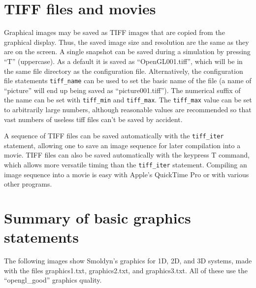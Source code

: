 \documentclass {scrbook}
\newcommand {\ttt} {\texttt}
\begin{document}
\section{TIFF files and movies}

Graphical images may be saved as TIFF images that are copied from the graphical display. Thus, the saved image size and resolution are the same as they are on the screen. A single snapshot can be saved during a simulation by pressing ``T'' (uppercase). As a default it is saved as ``OpenGL001.tiff'', which will be in the same file directory as the configuration file. Alternatively, the configuration file statements \ttt{tiff\_name} can be used to set the basic name of the file (a name of ``picture'' will end up being saved as ``picture001.tiff''). The numerical suffix of the name can be set with \ttt{tiff\_min} and \ttt{tiff\_max}. The \ttt{tiff\_max} value can be set to arbitrarily large numbers, although reasonable values are recommended so that vast numbers of useless tiff files can't be saved by accident.

A sequence of TIFF files can be saved automatically with the \ttt{tiff\_iter} statement, allowing one to save an image sequence for later compilation into a movie. TIFF files can also be saved automatically with the keypress T command, which allows more versatile timing than the \ttt{tiff\_iter} statement. Compiling an image sequence into a movie is easy with Apple's QuickTime Pro or with various other programs.

\section{Summary of basic graphics statements}

The following images show Smoldyn's graphics for 1D, 2D, and 3D systems, made with the files graphics1.txt, graphics2.txt, and graphics3.txt. All of these use the ``opengl\_good'' graphics quality.
\end{document}
